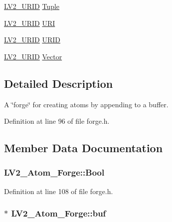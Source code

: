 \begin{DoxyCompactItemize}
\item 
\hyperlink{urid_8h_a5ff0630d245539e9f6dca10ff3c40fae}{L\+V2\+\_\+\+U\+R\+ID} \hyperlink{struct_l_v2___atom___forge_a74ef1b76c8ddb112647f320d5a6cb431}{Tuple}
\item 
\hyperlink{urid_8h_a5ff0630d245539e9f6dca10ff3c40fae}{L\+V2\+\_\+\+U\+R\+ID} \hyperlink{struct_l_v2___atom___forge_a91872b378897e24591c536b80b2ab03a}{U\+RI}
\item 
\hyperlink{urid_8h_a5ff0630d245539e9f6dca10ff3c40fae}{L\+V2\+\_\+\+U\+R\+ID} \hyperlink{struct_l_v2___atom___forge_ae72229c35e9a57d20de9b17eda8f2d59}{U\+R\+ID}
\item 
\hyperlink{urid_8h_a5ff0630d245539e9f6dca10ff3c40fae}{L\+V2\+\_\+\+U\+R\+ID} \hyperlink{struct_l_v2___atom___forge_a27f8ab6881b64f049207749c72910588}{Vector}
\end{DoxyCompactItemize}


\subsection{Detailed Description}
A \char`\"{}forge\char`\"{} for creating atoms by appending to a buffer. 

Definition at line 96 of file forge.\+h.



\subsection{Member Data Documentation}
\subsubsection[{\texorpdfstring{Bool}{Bool}}]{ L\+V2\+\_\+\+Atom\+\_\+\+Forge\+::\+Bool}\hypertarget{struct_l_v2___atom___forge_aa9edbb6b79c332e24810530fde3797d1}{}\label{struct_l_v2___atom___forge_aa9edbb6b79c332e24810530fde3797d1}


Definition at line 108 of file forge.\+h.

\subsubsection[{\texorpdfstring{buf}{buf}}]{$\ast$ L\+V2\+\_\+\+Atom\+\_\+\+Forge\+::buf}\hypertarget{struct_l_v2___atom___forge_ab6236f0f581165cf959188212cf98860}{}\label{struct_l_v2___atom___forge_ab6236f0f581165cf959188212cf98860}


